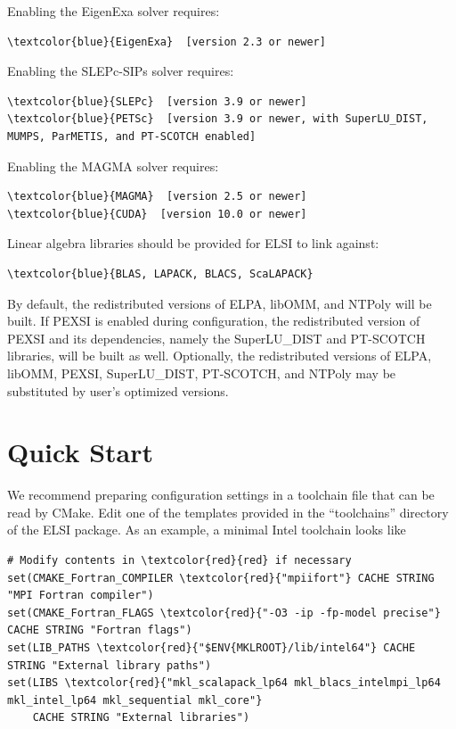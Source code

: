 \documentclass{report}
\begin{document}
Enabling the EigenExa solver requires:
\begin{Verbatim}[commandchars=\\\{\}]
\textcolor{blue}{EigenExa}  [version 2.3 or newer]
\end{Verbatim}

Enabling the SLEPc-SIPs solver requires:
\begin{Verbatim}[commandchars=\\\{\}]
\textcolor{blue}{SLEPc}  [version 3.9 or newer]
\textcolor{blue}{PETSc}  [version 3.9 or newer, with SuperLU_DIST, MUMPS, ParMETIS, and PT-SCOTCH enabled]
\end{Verbatim}

Enabling the MAGMA solver requires:
\begin{Verbatim}[commandchars=\\\{\}]
\textcolor{blue}{MAGMA}  [version 2.5 or newer]
\textcolor{blue}{CUDA}  [version 10.0 or newer]
\end{Verbatim}

Linear algebra libraries should be provided for ELSI to link against:
\begin{Verbatim}[commandchars=\\\{\}]
\textcolor{blue}{BLAS, LAPACK, BLACS, ScaLAPACK}
\end{Verbatim}

By default, the redistributed versions of ELPA, libOMM, and NTPoly will be built. If PEXSI is enabled during configuration, the redistributed version of PEXSI and its dependencies, namely the SuperLU\_DIST and PT-SCOTCH libraries, will be built as well. Optionally, the redistributed versions of ELPA, libOMM, PEXSI, SuperLU\_DIST, PT-SCOTCH, and NTPoly may be substituted by user's optimized versions.

\section{Quick Start}
\label{sec:quick}
We recommend preparing configuration settings in a toolchain file that can be read by CMake. Edit one of the templates provided in the ``toolchains'' directory of the ELSI package. As an example, a minimal Intel toolchain looks like
\begin{tcolorbox}
\begin{Verbatim}[commandchars=\\\{\}]
# Modify contents in \textcolor{red}{red} if necessary
set(CMAKE_Fortran_COMPILER \textcolor{red}{"mpiifort"} CACHE STRING "MPI Fortran compiler")
set(CMAKE_Fortran_FLAGS \textcolor{red}{"-O3 -ip -fp-model precise"} CACHE STRING "Fortran flags")
set(LIB_PATHS \textcolor{red}{"$ENV{MKLROOT}/lib/intel64"} CACHE STRING "External library paths")
set(LIBS \textcolor{red}{"mkl_scalapack_lp64 mkl_blacs_intelmpi_lp64 mkl_intel_lp64 mkl_sequential mkl_core"}
    CACHE STRING "External libraries")
\end{Verbatim}
\end{tcolorbox}
\end{document}
